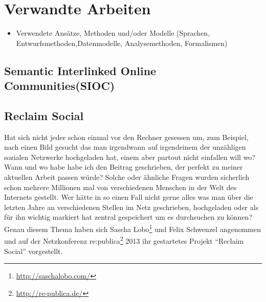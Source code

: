 
\chapter{Verwandte Arbeiten} %
\label{cha:verwandte_arbeiten}

\begin{itemize}
    \item Verwendete Ansätze, Methoden und/oder Modelle (Sprachen, Entwurfsmethoden,Datenmodelle, Analysemethoden, Formalismen)
\end{itemize}


\section{Semantic Interlinked Online Communities(SIOC)} %
\label{sec:verw_arbeiten_sioc}


\section{Reclaim Social} %
\label{sec:verw_arbeiten_reclaim_social}

Hat sich nicht jeder schon einmal vor den Rechner gesessen um, zum Beispiel, nach einen Bild gesucht das man irgendwann auf irgendeinem der unzähligen sozialen Netzwerke hochgeladen hat, einem aber partout nicht einfallen will wo? Wann und wo habe habe ich den Beitrag geschrieben, der perfekt zu meiner aktuellen Arbeit passen würde? Solche oder ähnliche Fragen wurden sicherlich schon mehrere Millionen mal von verschiedenen Menschen in der Welt des Internets gestellt. Wer hätte in so einen Fall nicht gerne alles was man über die letzten Jahre an verschiedenen Stellen im Netz geschrieben, hochgeladen oder als für ihn wichtig markiert hat zentral gespeichert um es durchsuchen zu können? Genau diesem Thema haben sich Sascha Lobo\footnote{\url{http://saschalobo.com/}} und Felix Schwenzel angenommen und auf der Netzkonferenz re:publica\footnote{\url{http://re-publica.de/}} 2013 ihr gestartetes Projekt \enquote{Reclaim Social} \cite{online:reclaim_2013} vorgestellt.

\medskip

